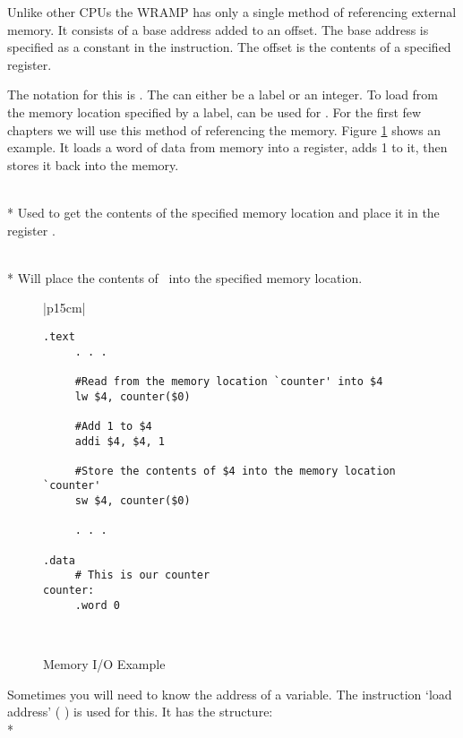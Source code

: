 Unlike other CPUs the WRAMP has only a single method of referencing
external memory.  It consists of a base address added to an offset.
The base address is specified as a constant in the instruction.  The
offset is the contents of a specified register.

The notation for this is .  The  can either
be a label or an integer.  To load from the memory location specified
by a label,  can be used for \regs.  For the first few chapters
we will use this method of referencing the memory. Figure \ref{memio}
shows an example. It loads a word of data from memory into a register,
adds 1 to it, then stores it back into the memory.


\\*
Used to get the contents of the specified memory location and place it 
in the register \regd.

\\*
Will place the contents of \regd\ into the specified memory location.
\\


\begin{figure}[btp]
\begin{center}
\begin{tabular}{|p{15cm}|}
\hline
\begin{verbatim}
.text
     . . .

     #Read from the memory location `counter' into $4
     lw $4, counter($0)

     #Add 1 to $4
     addi $4, $4, 1

     #Store the contents of $4 into the memory location `counter'
     sw $4, counter($0)

     . . .
     
.data
     # This is our counter
counter:
     .word 0 
\end{verbatim}%
\\
\hline
\end{tabular}
\end{center}
\caption{Memory I/O Example}
\label{memio}
\end{figure}

Sometimes you will need to know the address of a variable.  The 
instruction `load address' (  ) is used for this. It has the 
structure:
\\*

